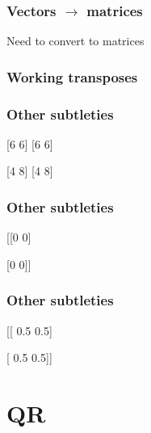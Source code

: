 \documentclass{beamer}
\begin{document}
\begin{frame}
\frametitle{Vectors $\to$ matrices}

Need to convert to matrices


\end{frame}

\begin{frame}
\frametitle{Working transposes}


\end{frame}

\begin{frame}
\frametitle{Other subtleties}


\pause

\begin{center}
[6 6] [6 6]

[4 8] [4 8]
\end{center}

\end{frame}


\begin{frame}
\frametitle{Other subtleties}


\pause

\begin{center}
[[0 0]

 [0 0]]
\end{center}

\end{frame}


\begin{frame}
\frametitle{Other subtleties}


\pause

\begin{center}
[[ 0.5  0.5]

 [ 0.5  0.5]]
\end{center}

\end{frame}


\section{QR}
\end{document}
